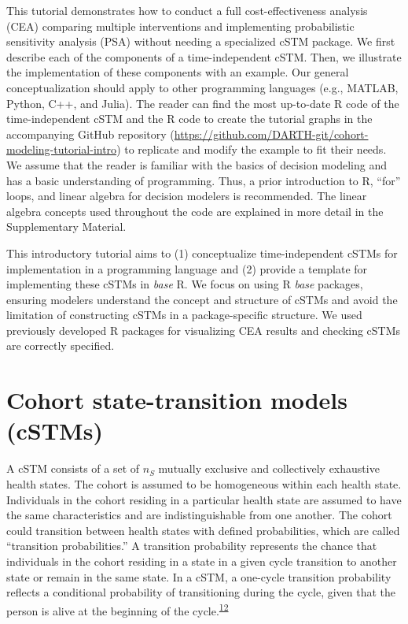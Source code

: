 \documentclass[
]{article}
\begin{document}
This tutorial demonstrates how to conduct a full cost-effectiveness analysis (CEA) comparing multiple interventions and implementing probabilistic sensitivity analysis (PSA) without needing a specialized cSTM package. We first describe each of the components of a time-independent cSTM. Then, we illustrate the implementation of these components with an example. Our general conceptualization should apply to other programming languages (e.g., MATLAB, Python, C++, and Julia). The reader can find the most up-to-date R code of the time-independent cSTM and the R code to create the tutorial graphs in the accompanying GitHub repository (\url{https://github.com/DARTH-git/cohort-modeling-tutorial-intro}) to replicate and modify the example to fit their needs. We assume that the reader is familiar with the basics of decision modeling and has a basic understanding of programming. Thus, a prior introduction to R, ``for'' loops, and linear algebra for decision modelers is recommended. The linear algebra concepts used throughout the code are explained in more detail in the Supplementary Material.

This introductory tutorial aims to (1) conceptualize time-independent cSTMs for implementation in a programming language and (2) provide a template for implementing these cSTMs in \emph{base} R. We focus on using R \emph{base} packages, ensuring modelers understand the concept and structure of cSTMs and avoid the limitation of constructing cSTMs in a package-specific structure. We used previously developed R packages for visualizing CEA results and checking cSTMs are correctly specified.

\hypertarget{cohort-state-transition-models-cstms}{%
\section{Cohort state-transition models (cSTMs)}\label{cohort-state-transition-models-cstms}}

A cSTM consists of a set of \(n_S\) mutually exclusive and collectively exhaustive health states. The cohort is assumed to be homogeneous within each health state. Individuals in the cohort residing in a particular health state are assumed to have the same characteristics and are indistinguishable from one another. The cohort could transition between health states with defined probabilities, which are called ``transition probabilities.'' A transition probability represents the chance that individuals in the cohort residing in a state in a given cycle transition to another state or remain in the same state. In a cSTM, a one-cycle transition probability reflects a conditional probability of transitioning during the cycle, given that the person is alive at the beginning of the cycle.\textsuperscript{\protect\hyperlink{ref-Miller1994}{12}}
\end{document}
